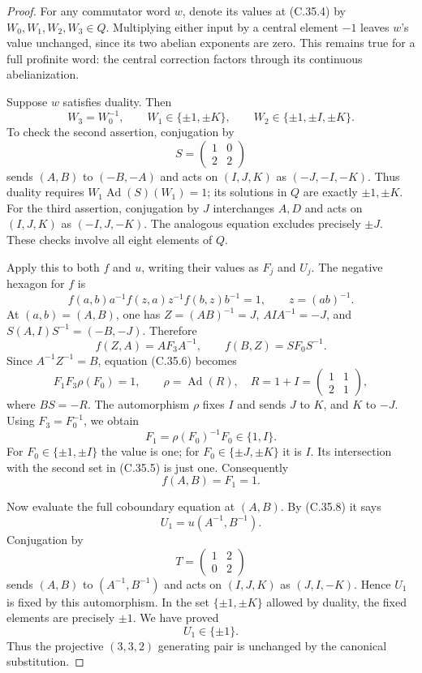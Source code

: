 \begin{proof}
For any commutator word \(w\), denote its values at (C.35.4) by
\(W_0,W_1,W_2,W_3\in Q\). Multiplying either input by a
central element \(-1\) leaves \(w\)'s value unchanged, since
its two abelian exponents are zero. This remains true for a full
profinite word: the central correction factors through its
continuous abelianization.

Suppose \(w\) satisfies duality. Then
\[
 W_3=W_0^{-1},\qquad
 W_1\in\{\pm1,\pm K\},\qquad
 W_2\in\{\pm1,\pm I,\pm K\}.
 \tag{C.35.5}
\]
To check the second assertion, conjugation by
\[
                         S=\begin{pmatrix}1&0\\2&2\end{pmatrix}
\]
sends \((A,B)\) to \((-B,-A)\) and acts on
\((I,J,K)\) as \((-J,-I,-K)\). Thus duality requires
\(W_1\operatorname{Ad}(S)(W_1)=1\); its solutions in
\(Q\) are exactly \(\pm1,\pm K\).
For the third assertion, conjugation by \(J\) interchanges
\(A,D\) and acts on \((I,J,K)\) as
\((-I,J,-K)\). The analogous equation excludes precisely
\(\pm J\). These checks involve all eight elements of \(Q\).

Apply this to both \(f\) and \(u\), writing their values as
\(F_j\) and \(U_j\). The negative hexagon for \(f\) is
\[
       f(a,b)a^{-1}f(z,a)z^{-1}f(b,z)b^{-1}=1,
       \qquad z=(ab)^{-1}.
 \tag{C.35.6}
\]
At \((a,b)=(A,B)\), one has \(Z=(AB)^{-1}=J\),
\(AIA^{-1}=-J\), and
\(S(A,I)S^{-1}=(-B,-J)\). Therefore
\[
          f(Z,A)=AF_3A^{-1},\qquad f(B,Z)=SF_0S^{-1}.
\]
Since \(A^{-1}Z^{-1}=B\), equation (C.35.6) becomes
\[
                        F_1F_3\rho(F_0)=1,
 \qquad \rho=\operatorname{Ad}(R),\quad
 R=1+I=\begin{pmatrix}1&1\\2&1\end{pmatrix},
 \tag{C.35.7}
\]
where \(BS=-R\). The automorphism \(\rho\) fixes \(I\)
and sends \(J\) to \(K\), and \(K\) to \(-J\).
Using \(F_3=F_0^{-1}\), we obtain
\[
                    F_1=\rho(F_0)^{-1}F_0\in\{1,I\}.
\]
For \(F_0\in\{\pm1,\pm I\}\) the value is one; for
\(F_0\in\{\pm J,\pm K\}\) it is \(I\).
Its intersection with the second set in (C.35.5) is just one.
Consequently
\[
                              f(A,B)=F_1=1.
 \tag{C.35.8}
\]

Now evaluate the full coboundary equation at \((A,B)\).
By (C.35.8) it says
\[
                          U_1=u(A^{-1},B^{-1}).
\]
Conjugation by
\[
                         T=\begin{pmatrix}1&2\\0&2\end{pmatrix}
\]
sends \((A,B)\) to \((A^{-1},B^{-1})\) and acts on
\((I,J,K)\) as \((J,I,-K)\). Hence \(U_1\) is fixed
by this automorphism. In the set \(\{\pm1,\pm K\}\)
allowed by duality, the fixed elements are precisely \(\pm1\).
We have proved
\[
                              U_1\in\{\pm1\}.
 \tag{C.35.9}
\]
Thus the projective \((3,3,2)\) generating pair is unchanged
by the canonical substitution.


\end{proof}
